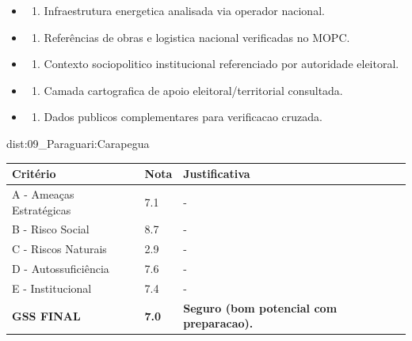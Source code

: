 {\begin{itemize}
\item
  \begin{enumerate}
  \def\labelenumi{\arabic{enumi})}
  \setcounter{enumi}{7}
  \tightlist
  \item
    Infraestrutura energetica analisada via operador nacional.
  \end{enumerate}
\item
  \begin{enumerate}
  \def\labelenumi{\arabic{enumi})}
  \setcounter{enumi}{8}
  \tightlist
  \item
    Referências de obras e logistica nacional verificadas no MOPC.
  \end{enumerate}
\item
  \begin{enumerate}
  \def\labelenumi{\arabic{enumi})}
  \setcounter{enumi}{9}
  \tightlist
  \item
    Contexto sociopolitico institucional referenciado por autoridade
    eleitoral.
  \end{enumerate}
\item
  \begin{enumerate}
  \def\labelenumi{\arabic{enumi})}
  \setcounter{enumi}{10}
  \tightlist
  \item
    Camada cartografica de apoio eleitoral/\allowbreak territorial consultada.
  \end{enumerate}
\item
  \begin{enumerate}
  \def\labelenumi{\arabic{enumi})}
  \setcounter{enumi}{11}
  \tightlist
  \item
    Dados publicos complementares para verificacao cruzada.
  \end{enumerate}
\end{itemize}}{dist:09_Paraguari:Carapegua}
\begin{table}[ht!]
\small \begin{tabular}{p{3.0cm}p{0.8cm}p{6.0cm}} \toprule
\textbf{Critério} & \textbf{Nota} & \textbf{Justificativa} \\ \midrule
A - Ameaças Estratégicas & 7.1 & - \\
B - Risco Social & 8.7 & - \\
C - Riscos Naturais & 2.9 & - \\
D - Autossuficiência & 7.6 & - \\
E - Institucional & 7.4 & - \\
\midrule \textbf{GSS FINAL} & \textbf{7.0} & \textbf{Seguro (bom potencial com preparacao).} \\ \bottomrule \end{tabular}
\end{table}
